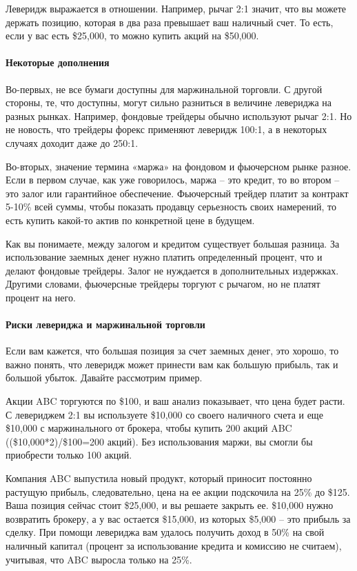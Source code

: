 \documentclass[a5paper]{article}
\begin{document}
Леверидж выражается в отношении. Например, рычаг 2:1 значит, что вы
можете держать позицию, которая в два раза превышает ваш наличный
счет. То есть, если у вас есть \$25,000, то можно купить акций на
\$50,000.

\paragraph{Некоторые дополнения}

Во-первых, не все бумаги доступны для маржинальной торговли. С другой стороны, те, что доступны, могут сильно разниться в величине левериджа на разных рынках. Например, фондовые трейдеры обычно используют рычаг 2:1. Но не новость, что трейдеры форекс применяют леверидж 100:1, а в некоторых случаях доходит даже до 250:1.

Во-вторых, значение термина «маржа» на фондовом и фьючерсном рынке разное. Если в первом случае, как уже говорилось, маржа – это кредит, то во втором – это залог или гарантийное обеспечение. Фьючерсный трейдер платит за контракт 5-10\% всей суммы, чтобы показать продавцу серьезность своих намерений, то есть купить какой-то актив по конкретной цене в будущем.

Как вы понимаете, между залогом и кредитом существует большая
разница. За использование заемных денег нужно платить определенный
процент, что и делают фондовые трейдеры. Залог не нуждается в
дополнительных издержках. Другими словами, фьючерсные трейдеры торгуют
с рычагом, но не платят процент на него.

\paragraph{Риски левериджа и маржинальной торговли}

Если вам кажется, что большая позиция за счет заемных денег, это хорошо, то важно понять, что леверидж может принести вам как большую прибыль, так и большой убыток. Давайте рассмотрим пример.

Акции ABC торгуются по \$100, и ваш анализ показывает, что цена будет расти. С левериджем 2:1 вы используете \$10,000 со своего наличного счета и еще \$10,000 с маржинального от брокера, чтобы купить 200 акций ABC ((\$10,000*2)/\$100=200 акций). Без использования маржи, вы смогли бы приобрести только 100 акций.

Компания ABC выпустила новый продукт, который приносит постоянно растущую прибыль, следовательно, цена на ее акции подскочила на 25\% до \$125. Ваша позиция сейчас стоит \$25,000, и вы решаете закрыть ее. \$10,000 нужно возвратить брокеру, а у вас остается \$15,000, из которых \$5,000 – это прибыль за сделку. При помощи левериджа вам удалось получить доход в 50\% на свой наличный капитал (процент за использование кредита и комиссию не считаем), учитывая, что ABC выросла только на 25\%.
\end{document}
